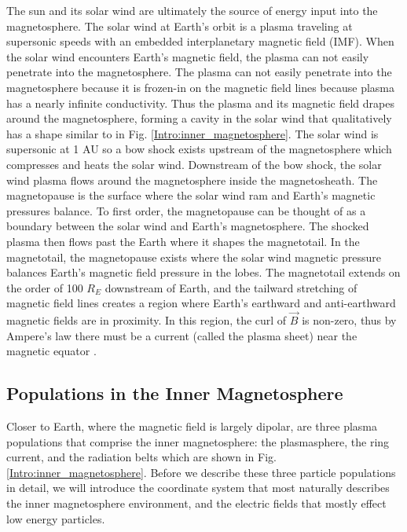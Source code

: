 The sun and its solar wind are ultimately the source of energy input into the magnetosphere. The solar wind at Earth's orbit is a plasma traveling at supersonic speeds with an embedded interplanetary magnetic field (IMF). When the solar wind encounters Earth's magnetic field, the plasma can not easily penetrate into the magnetosphere. The plasma can not easily penetrate into the magnetosphere because it is frozen-in on the magnetic field lines because plasma has a nearly infinite conductivity. Thus the plasma and its magnetic field drapes around the magnetosphere, forming a cavity in the solar wind that qualitatively has a shape similar to in Fig. \ref{Intro:inner_magnetosphere}. The solar wind is supersonic at 1 AU so a bow shock exists upstream of the magnetosphere which compresses and heats the solar wind. Downstream of the bow shock, the solar wind plasma flows around the magnetosphere inside the magnetosheath. The magnetopause is the surface where the solar wind ram and Earth's magnetic pressures balance. To first order, the magnetopause can be thought of as a boundary between the solar wind and Earth's magnetosphere. The shocked plasma then flows past the Earth where it shapes the magnetotail. In the magnetotail, the magnetopause exists where the solar wind magnetic pressure balances Earth's magnetic field pressure in the lobes. The magnetotail extends on the order of 100 $R_E$ downstream of Earth, and the tailward stretching of magnetic field lines creates a region where Earth's earthward and anti-earthward magnetic fields are in proximity. In this region, the curl of $\vec{B}$ is non-zero, thus by Ampere's law there must be a current (called the plasma sheet) near the magnetic equator \citep[e.g.][]{Eastwood2015}.

\subsection{Populations in the Inner Magnetosphere}\label{Intro:inner_mag}
Closer to Earth, where the magnetic field is largely dipolar, are three plasma populations that comprise the inner magnetosphere: the plasmasphere, the ring current, and the radiation belts which are shown in Fig. \ref{Intro:inner_magnetosphere}. Before we describe these three particle populations in detail, we will introduce the coordinate system that most naturally describes the inner magnetosphere environment, and the electric fields that mostly effect low energy particles.

